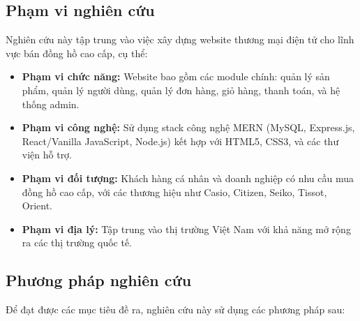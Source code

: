 \documentclass[a4paper,12pt]{report}
\begin{document}
\subsection*{Phạm vi nghiên cứu}

Nghiên cứu này tập trung vào việc xây dựng website thương mại điện tử cho lĩnh vực bán đồng hồ cao cấp, cụ thể:

\begin{itemize}
    \item \textbf{Phạm vi chức năng:} Website bao gồm các module chính: quản lý sản phẩm, quản lý người dùng, quản lý đơn hàng, giỏ hàng, thanh toán, và hệ thống admin.
    
    \item \textbf{Phạm vi công nghệ:} Sử dụng stack công nghệ MERN (MySQL, Express.js, React/Vanilla JavaScript, Node.js) kết hợp với HTML5, CSS3, và các thư viện hỗ trợ.
    
    \item \textbf{Phạm vi đối tượng:} Khách hàng cá nhân và doanh nghiệp có nhu cầu mua đồng hồ cao cấp, với các thương hiệu như Casio, Citizen, Seiko, Tissot, Orient.
    
    \item \textbf{Phạm vi địa lý:} Tập trung vào thị trường Việt Nam với khả năng mở rộng ra các thị trường quốc tế.
\end{itemize}

\subsection*{Phương pháp nghiên cứu}

Để đạt được các mục tiêu đề ra, nghiên cứu này sử dụng các phương pháp sau:
\end{document}
